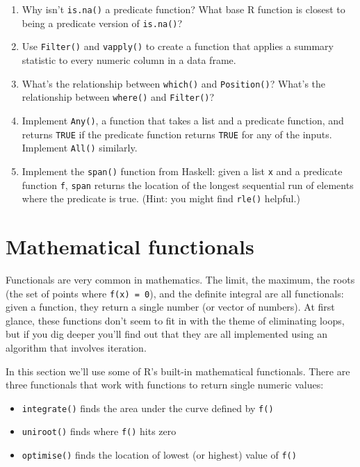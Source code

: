 \begin{enumerate}
\def\labelenumi{\arabic{enumi}.}
\item
  Why isn't \texttt{is.na()} a predicate function? What base R function
  is closest to being a predicate version of \texttt{is.na()}?
\item
  Use \texttt{Filter()} and \texttt{vapply()} to create a function that
  applies a summary statistic to every numeric column in a data frame.
\item
  What's the relationship between \texttt{which()} and
  \texttt{Position()}? What's the relationship between \texttt{where()}
  and \texttt{Filter()}?
\item
  Implement \texttt{Any()}, a function that takes a list and a predicate
  function, and returns \texttt{TRUE} if the predicate function returns
  \texttt{TRUE} for any of the inputs. Implement \texttt{All()}
  similarly.
\item
  Implement the \texttt{span()} function from Haskell: given a list
  \texttt{x} and a predicate function \texttt{f}, \texttt{span} returns
  the location of the longest sequential run of elements where the
  predicate is true. (Hint: you might find \texttt{rle()} helpful.)
\end{enumerate}

\hypertarget{functionals-math}{%
\section{Mathematical functionals}\label{functionals-math}}

Functionals are very common in mathematics. The limit, the maximum, the
roots (the set of points where \texttt{f(x)\ =\ 0}), and the definite
integral are all functionals: given a function, they return a single
number (or vector of numbers). At first glance, these functions don't
seem to fit in with the theme of eliminating loops, but if you dig
deeper you'll find out that they are all implemented using an algorithm
that involves iteration.

In this section we'll use some of R's built-in mathematical functionals.
There are three functionals that work with functions to return single
numeric values:  

\begin{itemize}
\tightlist
\item
  \texttt{integrate()} finds the area under the curve defined by
  \texttt{f()}
\item
  \texttt{uniroot()} finds where \texttt{f()} hits zero
\item
  \texttt{optimise()} finds the location of lowest (or highest) value of
  \texttt{f()}
\end{itemize}

